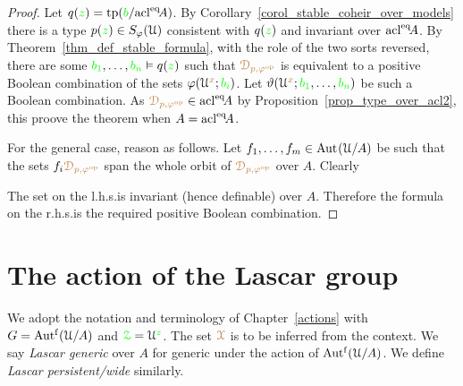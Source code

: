 \begin{proof}
  Let $q({\color{green} z})={\rm tp}({\color{green} b}/{\rm acl}^{{\rm eq}}\!A)$.
  By Corollary~\ref{corol_stable_coheir_over_models} there is a type $p({\color{green} z})\in S_\varphi(\EuScript U)$ consistent with $q({\color{green} z})$ and invariant over ${\rm acl}^{{\rm eq}}\!A$.
  By Theorem~\ref{thm_def_stable_formula}, with the role of the two sorts reversed, there are some ${\color{green} b_1},\dots,{\color{green} b_n}\vDash q({\color{green} z})$ such that ${\color{brown}\EuScript D_{p,\varphi^{\rm op}}}$ is equivalent to a positive Boolean combination of the sets $\varphi(\EuScript U^{\color{brown} x};{\color{green} b_i})$.
  Let $\vartheta(\EuScript U^{\color{brown} x};{\color{green} b_1},\dots,{\color{green} b_n})$ be such a Boolean combination.
  As ${\color{brown}\EuScript D_{p,\varphi^{\rm op}}}\in{\rm acl}^{{\rm eq}}\!A$ by Proposition~\ref{prop_type_over_acl2}, this proove the theorem when $A={\rm acl}^{{\rm eq}}\!A$.

  For the general case, reason as follows.
  Let $f_1,\dots,f_m\in{\rm Aut\kern.15ex}(\EuScript U/A)$ be such that the sets $f_i{\color{brown}\EuScript D_{p,\varphi^{\rm op}}}$ span the whole orbit of ${\color{brown}\EuScript D_{p,\varphi^{\rm op}}}$ over $A$.
  Clearly


  The set on the l.h.s.\@ is invariant (hence definable) over $A$.
  Therefore the formula on the r.h.s.\@ is the required positive Boolean combination.
\end{proof}

\section{The action of the Lascar group}\label{Lascar_action}

\def\medrel#1{\parbox[t]{6ex}{$\displaystyle\hfil #1$}}
\def\ceq#1#2#3{\parbox{10ex}{$\displaystyle #1$}\medrel{#2}$\displaystyle  #3$}

We adopt the notation and terminology of Chapter~\ref{actions} with $G=\mbox{Aut$^{\rm f}$}(\EuScript U/A)$ and ${\color{green}\EuScript Z}=\EuScript U^{\color{green} z}$.
The set ${\color{brown}\EuScript X}$ is to be inferred from the context.
We say \emph{Lascar generic\/} over $A$ for generic under the action of $\mbox{Aut$^{\rm f}$}(\EuScript U/A)$.
We define \emph{Lascar persistent/wide\/} similarly.

